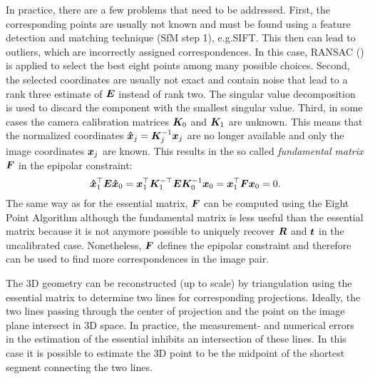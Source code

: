 			In practice, there are a few problems that need to be addressed.
			First, the corresponding points are usually not known and must be found using a feature detection and matching technique (SfM step 1), e.g.\@ SIFT.
			This then can lead to outliers, which are incorrectly assigned correspondences.
			In this case, {RANSAC} (\cite{fischler1981random}) is applied to select the best eight points among many possible choices.
			Second, the selected coordinates are usually not exact and contain noise that lead to a rank three estimate of $\bm{E}$ instead of rank two.
			The singular value decomposition is used to discard the component with the smallest singular value.
			Third, in some cases the camera calibration matrices $\bm{K}_0$ and $\bm{K}_1$ are unknown.
			This means that the normalized coordinates $\bm{\hat{x}}_j = \bm{K}_j^{-1} \bm{x}_j$ are no longer available and only the image coordinates $\bm{x}_j$ are known.
			This results in the so called \emph{fundamental matrix} $\bm{F}$ in the epipolar constraint:
			\begin{equation}\label{eq:fundamental_matrix_epipolar_constraint}
				\bm{\hat{x}}_1^\top \bm{E} \bm{\hat{x}}_0 = 
				\bm{x}_1^\top \bm{K}_1^{-\top} \bm{E} \bm{K}_0^{-1} \bm{x}_0 = 
				\bm{x}_1^\top \bm{F} \bm{x}_0 = 0.
			\end{equation}
			The same way as for the essential matrix, $\bm{F}$ can be computed using the Eight Point Algorithm although the fundamental matrix is less useful than the essential matrix because it is not anymore possible to uniquely recover $\bm{R}$ and $\bm{t}$ in the uncalibrated case.
			Nonetheless, $\bm{F}$ defines the epipolar constraint and therefore can be used to find more correspondences in the image pair.
			
			The 3D geometry can be reconstructed (up to scale) by triangulation using the essential matrix to determine two lines for corresponding projections.
			Ideally, the two lines passing through the center of projection and the point on the image plane intersect in 3D space.
			In practice, the measurement- and numerical errors in the estimation of the essential inhibits an intersection of these lines.
			In this case it is possible to estimate the 3D point to be the midpoint of the shortest segment connecting the two lines.
			
			

